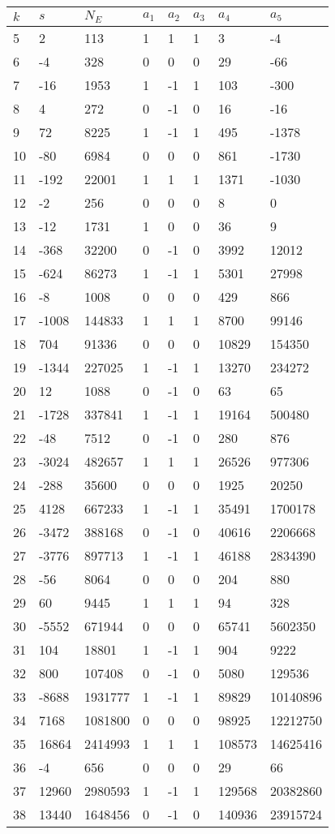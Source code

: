 \documentclass{amsart}
\begin{document}
\begin{longtable}{|l|l|l|lllll|}
\hline
$k$ & $s$ & $N_E$ & $a_1$ & $a_2$ & $a_3$ & $a_4$ & $a_5$\\
\hline
5&2&113&1&1&1&3&-4\\
6&-4&328&0&0&0&29&-66\\
7&-16&1953&1&-1&1&103&-300\\
8&4&272&0&-1&0&16&-16\\
9&72&8225&1&-1&1&495&-1378\\
10&-80&6984&0&0&0&861&-1730\\
11&-192&22001&1&1&1&1371&-1030\\
12&-2&256&0&0&0&8&0\\
13&-12&1731&1&0&0&36&9\\
14&-368&32200&0&-1&0&3992&12012\\
15&-624&86273&1&-1&1&5301&27998\\
16&-8&1008&0&0&0&429&866\\
17&-1008&144833&1&1&1&8700&99146\\
18&704&91336&0&0&0&10829&154350\\
19&-1344&227025&1&-1&1&13270&234272\\
20&12&1088&0&-1&0&63&65\\
21&-1728&337841&1&-1&1&19164&500480\\
22&-48&7512&0&-1&0&280&876\\
23&-3024&482657&1&1&1&26526&977306\\
24&-288&35600&0&0&0&1925&20250\\
25&4128&667233&1&-1&1&35491&1700178\\
26&-3472&388168&0&-1&0&40616&2206668\\
27&-3776&897713&1&-1&1&46188&2834390\\
28&-56&8064&0&0&0&204&880\\
29&60&9445&1&1&1&94&328\\
30&-5552&671944&0&0&0&65741&5602350\\
31&104&18801&1&-1&1&904&9222\\
32&800&107408&0&-1&0&5080&129536\\
33&-8688&1931777&1&-1&1&89829&10140896\\
34&7168&1081800&0&0&0&98925&12212750\\
35&16864&2414993&1&1&1&108573&14625416\\
36&-4&656&0&0&0&29&66\\
37&12960&2980593&1&-1&1&129568&20382860\\
38&13440&1648456&0&-1&0&140936&23915724\\

\end{longtable}
\end{document}
